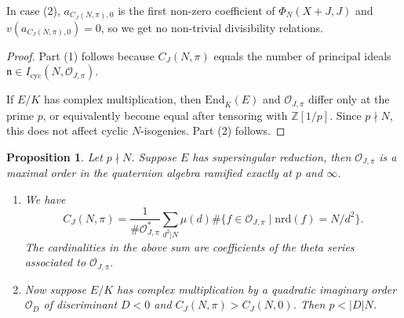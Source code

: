 \documentclass[11pt]{amsart}
\newtheorem{prop}{Proposition}[section]
\theoremstyle{definition}
\newcommand{\End} {{\mathrm{End}}}
\def\BZ{\mathbb{Z}}
\def\CO{\mathcal{O}}
\begin{document}
In case (2), $a_{C_J(N,\pi),0}$ is the first non-zero coefficient of $\Phi_N(X+J, J)$ and 
        $v(a_{C_J(N,\pi),0}) = 0$, so we get no non-trivial divisibility relations.

\begin{proof}
	Part (1) follows because $C_J(N,\pi)$ equals the number of principal ideals $\mathfrak{n} \in 
	I_{\mathrm{cyc}}(N,\CO_{J,\pi})$. 
	
	If $E/K$ has complex multiplication, then $\End_{\bar K}(E)$ and
	$\CO_{J,\pi}$ differ only at the prime $p$, or equivalently become equal
	after tensoring with $\BZ[1/p]$. Since $p\nmid N$, this does not affect
	cyclic $N$-isogenies. Part (2) follows.
\end{proof}

\begin{prop}\label{supersingular}
    Let $p\nmid N$. Suppose $E$ has supersingular reduction, then $\CO_{J,\pi}$ is a maximal order in the quaternion algebra ramified exactly at $p$ and $\infty$. 
    \begin{enumerate}
        \item We have
        \[
            C_J(N,\pi) = \frac{1}{\#\CO_{J,\pi}^*}\sum_{d^2|N}\mu(d)\#\{f\in\CO_{J,\pi} \; |\; \mathrm{nrd}(f) = N/d^2 \}.
        \]
        The cardinalities in the above sum are coefficients of the theta series associated to $\CO_{J,\pi}$.

        \item Now suppose $E/K$ has complex multiplication by a quadratic imaginary order $\CO_D$ of discriminant $D<0$ and $C_J(N,\pi) > C_J(N,0)$. Then $p < |D|N$.

    \end{enumerate}
\end{prop}
\end{document}
